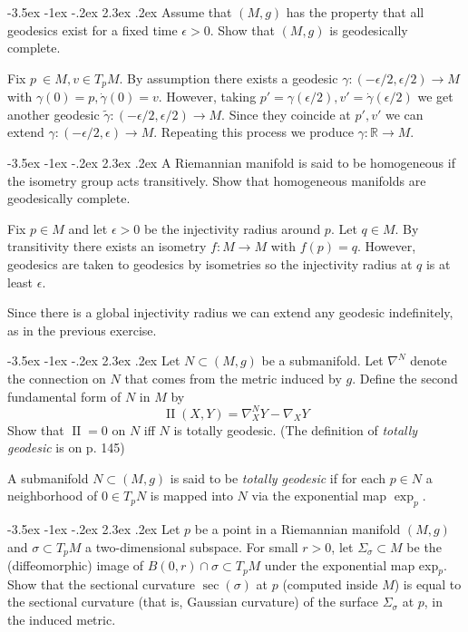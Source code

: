 \documentclass[10pt]{article}
\makeatletter
\renewcommand\section{\@startsection{section}{1}{\z@}%
                                  {-3.5ex \@plus -1ex \@minus -.2ex}%
                                  {2.3ex \@plus.2ex}%
                                  {\normalfont\large\bfseries}}
\newcommand{\R}{\ensuremath{\mathbb{R}}}
\DeclareMathOperator{\2}{II}
\makeatother
\begin{document}

\section{Assume that $(M,g)$ has the property that all geodesics exist for a fixed time $\epsilon > 0$. Show that $(M,g)$ is geodesically complete.}

Fix $p\ \in M, v \in T_p M$. By assumption there exists a geodesic $\gamma : (- \epsilon/2 , \epsilon / 2 ) \to M$ with $\gamma(0) = p, \dot{\gamma}(0) = v$. However, taking $p' = \gamma(\epsilon/2 ), v' = \dot{\gamma} ( \epsilon / 2)$ we get another geodesic $\tilde{\gamma} :  (- \epsilon/2 , \epsilon / 2 ) \to M$. Since they coincide at $p', v'$ we can extend $\gamma : (-\epsilon / 2 , \epsilon) \to M$. Repeating this process we produce $\gamma : \R \to M$.

\section{A Riemannian manifold is said to be homogeneous if the isometry group acts transitively. Show that homogeneous manifolds are geodesically complete.}

Fix $p \in M$ and let $\epsilon > 0 $ be the injectivity radius around $p$. 
Let $q \in M$. By transitivity there exists an isometry $f : M \to M $ with $f(p) = q$. However, geodesics are taken to geodesics by isometries so the injectivity radius at $q$ is at least $\epsilon$.

Since there is a global injectivity radius we can extend any geodesic indefinitely, as in the previous exercise.

\section{Let $N \subset (M,g)$ be a submanifold. Let $\nabla^N$ denote the connection on $N$ that comes from the metric induced by $g$. Define the second fundamental form of $N$ in $M$ by $$\2(X,Y) = \nabla_X^N Y - \nabla_X Y$$ Show that $\2 =0$ on $N$ iff $N$ is totally geodesic. (The definition of \emph{totally geodesic} is on p. 145)}

A submanifold $N \subset (M,g)$  is said to be \emph{totally geodesic} if for each $p \in N$ a neighborhood of $0 \in T_p N$ is mapped into $N$ via the exponential map $\exp_p$.

\section{Let $p$ be a point in a Riemannian manifold $(M, g)$ and $\sigma \subset T_p M$ a two-dimensional subspace. For small $r > 0$, let $\Sigma_\sigma \subset M$ be the (diffeomorphic) image of $B(0,r) \cap \sigma \subset T_pM$ under the exponential map exp$_p$. Show that the sectional curvature $\sec(\sigma)$ at $p$ (computed inside $M$) is equal to the sectional curvature (that is, Gaussian curvature) of the surface $\Sigma_\sigma$ at $p$, in the induced metric.}
\end{document}
